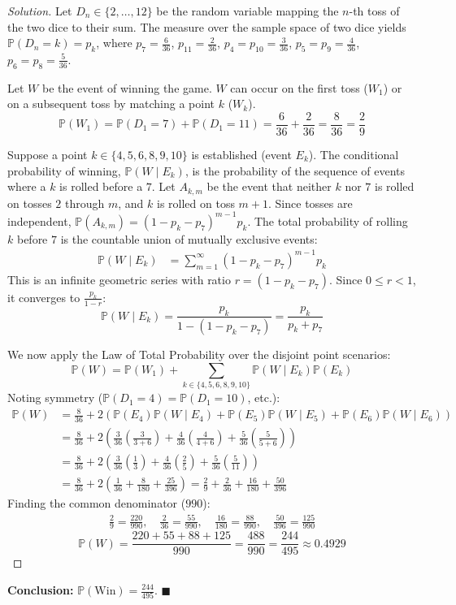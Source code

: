 \documentclass[11pt]{article}
\theoremstyle{definition}
\theoremstyle{plain}
\theoremstyle{remark}
\renewcommand{\P}{\mathbb{P}}
\newcommand{\1}{\mathbf{1}}
\begin{document}
\begin{proof}[Solution]
Let $D_n \in \{2, \dots, 12\}$ be the random variable mapping the $n$-th toss of the two dice to their sum. 
The measure over the sample space of two dice yields $\P(D_n = k) = p_k$, where $p_7 = \frac{6}{36}$, $p_{11} = \frac{2}{36}$, $p_4 = p_{10} = \frac{3}{36}$, $p_5 = p_9 = \frac{4}{36}$, $p_6 = p_8 = \frac{5}{36}$.

Let $W$ be the event of winning the game. $W$ can occur on the first toss ($W_1$) or on a subsequent toss by matching a point $k$ ($W_k$).
\[ \P(W_1) = \P(D_1 = 7) + \P(D_1 = 11) = \frac{6}{36} + \frac{2}{36} = \frac{8}{36} = \frac{2}{9} \]

Suppose a point $k \in \{4, 5, 6, 8, 9, 10\}$ is established (event $E_k$). The conditional probability of winning, $\P(W \mid E_k)$, is the probability of the sequence of events where a $k$ is rolled before a $7$.
Let $A_{k,m}$ be the event that neither $k$ nor $7$ is rolled on tosses $2$ through $m$, and $k$ is rolled on toss $m+1$. Since tosses are independent, $\P(A_{k,m}) = (1 - p_k - p_7)^{m-1} p_k$. 
The total probability of rolling $k$ before $7$ is the countable union of mutually exclusive events:
\begin{align*}
\P(W \mid E_k) &= \sum_{m=1}^\infty (1 - p_k - p_7)^{m-1} p_k 
\end{align*}
This is an infinite geometric series with ratio $r = (1 - p_k - p_7)$. Since $0 \le r < 1$, it converges to $\frac{p_k}{1 - r}$:
\[ \P(W \mid E_k) = \frac{p_k}{1 - (1 - p_k - p_7)} = \frac{p_k}{p_k + p_7} \]

We now apply the Law of Total Probability over the disjoint point scenarios:
\[ \P(W) = \P(W_1) + \sum_{k \in \{4,5,6,8,9,10\}} \P(W \mid E_k)\P(E_k) \]
Noting symmetry ($\P(D_1=4)=\P(D_1=10)$, etc.):
\begin{align*}
\P(W) &= \frac{8}{36} + 2 \left( \P(E_4)\P(W \mid E_4) + \P(E_5)\P(W \mid E_5) + \P(E_6)\P(W \mid E_6) \right) \\
      &= \frac{8}{36} + 2 \left( \frac{3}{36}\left(\frac{3}{3+6}\right) + \frac{4}{36}\left(\frac{4}{4+6}\right) + \frac{5}{36}\left(\frac{5}{5+6}\right) \right) \\
      &= \frac{8}{36} + 2 \left( \frac{3}{36}\left(\frac{1}{3}\right) + \frac{4}{36}\left(\frac{2}{5}\right) + \frac{5}{36}\left(\frac{5}{11}\right) \right) \\
      &= \frac{8}{36} + 2 \left( \frac{1}{36} + \frac{8}{180} + \frac{25}{396} \right) = \frac{2}{9} + \frac{2}{36} + \frac{16}{180} + \frac{50}{396}
\end{align*}
Finding the common denominator ($990$):
\begin{align*}
\frac{2}{9} = \frac{220}{990}, \quad \frac{2}{36} = \frac{55}{990}, \quad \frac{16}{180} = \frac{88}{990}, \quad \frac{50}{396} = \frac{125}{990} 
\end{align*}
\[ \P(W) = \frac{220 + 55 + 88 + 125}{990} = \frac{488}{990} = \frac{244}{495} \approx 0.4929 \]
\end{proof}
\textbf{Conclusion:} $\P(\text{Win}) = \frac{244}{495}$. $\blacksquare$
\end{document}

